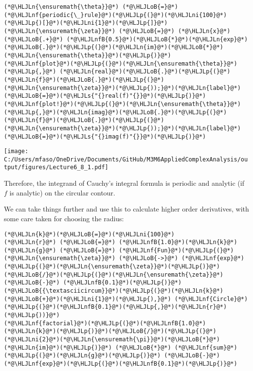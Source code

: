 \documentclass[12pt,a4paper]{article}
\newcommand{\HLJLn}[1]{#1}
\newcommand{\HLJLnf}[1]{\textcolor[RGB]{66,102,213}{#1}}
\newcommand{\HLJLs}[1]{\textcolor[RGB]{201,61,57}{#1}}
\newcommand{\HLJLnfB}[1]{\textcolor[RGB]{59,151,46}{#1}}
\newcommand{\HLJLni}[1]{\textcolor[RGB]{59,151,46}{#1}}
\newcommand{\HLJLoB}[1]{\textcolor[RGB]{102,102,102}{\textbf{#1}}}
\newcommand{\HLJLp}[1]{#1}
\begin{document}
\begin{lstlisting}
(*@\HLJLn{\ensuremath{\theta}}@*) (*@\HLJLoB{=}@*) (*@\HLJLnf{periodic{\_}rule}@*)(*@\HLJLp{(}@*)(*@\HLJLni{100}@*)(*@\HLJLp{)[}@*)(*@\HLJLni{1}@*)(*@\HLJLp{]}@*)
(*@\HLJLn{\ensuremath{\zeta}}@*) (*@\HLJLoB{=}@*) (*@\HLJLn{x}@*) (*@\HLJLoB{.+}@*) (*@\HLJLnfB{0.5}@*)(*@\HLJLoB{*}@*)(*@\HLJLn{exp}@*)(*@\HLJLoB{.}@*)(*@\HLJLp{(}@*)(*@\HLJLn{im}@*)(*@\HLJLoB{*}@*)(*@\HLJLn{\ensuremath{\theta}}@*)(*@\HLJLp{)}@*)
(*@\HLJLnf{plot}@*)(*@\HLJLp{(}@*)(*@\HLJLn{\ensuremath{\theta}}@*)(*@\HLJLp{,}@*) (*@\HLJLn{real}@*)(*@\HLJLoB{.}@*)(*@\HLJLp{(}@*)(*@\HLJLn{f}@*)(*@\HLJLoB{.}@*)(*@\HLJLp{(}@*)(*@\HLJLn{\ensuremath{\zeta}}@*)(*@\HLJLp{));}@*)(*@\HLJLn{label}@*)(*@\HLJLoB{=}@*)(*@\HLJLs{"{}real(f)"{}}@*)(*@\HLJLp{)}@*)
(*@\HLJLnf{plot!}@*)(*@\HLJLp{(}@*)(*@\HLJLn{\ensuremath{\theta}}@*)(*@\HLJLp{,}@*)(*@\HLJLn{imag}@*)(*@\HLJLoB{.}@*)(*@\HLJLp{(}@*)(*@\HLJLn{f}@*)(*@\HLJLoB{.}@*)(*@\HLJLp{(}@*)(*@\HLJLn{\ensuremath{\zeta}}@*)(*@\HLJLp{));}@*)(*@\HLJLn{label}@*)(*@\HLJLoB{=}@*)(*@\HLJLs{"{}imag(f)"{}}@*)(*@\HLJLp{)}@*)
\end{lstlisting}

\texttt{[image: C:/Users/mfaso/OneDrive/Documents/GitHub/M3M6AppliedComplexAnalysis/output/figures/Lecture6\_8\_1.pdf]}

Therefore, the integrand of Cauchy's integral formula is periodic and analytic (if $f$ is analytic) on the circular contour.

We can take things further and use this to calculate higher order derivatives, with some care taken for choosing the radius:


\begin{lstlisting}
(*@\HLJLn{k}@*)(*@\HLJLoB{=}@*)(*@\HLJLni{100}@*)
(*@\HLJLn{r}@*) (*@\HLJLoB{=}@*) (*@\HLJLnfB{1.0}@*)(*@\HLJLn{k}@*)
(*@\HLJLn{g}@*) (*@\HLJLoB{=}@*) (*@\HLJLnf{Fun}@*)(*@\HLJLp{(}@*) (*@\HLJLn{\ensuremath{\zeta}}@*) (*@\HLJLoB{->}@*) (*@\HLJLnf{exp}@*)(*@\HLJLp{(}@*)(*@\HLJLn{\ensuremath{\zeta}}@*)(*@\HLJLp{)}@*)(*@\HLJLoB{/}@*)(*@\HLJLp{(}@*)(*@\HLJLn{\ensuremath{\zeta}}@*) (*@\HLJLoB{-}@*) (*@\HLJLnfB{0.1}@*)(*@\HLJLp{)}@*)(*@\HLJLoB{{\textasciicircum}}@*)(*@\HLJLp{(}@*)(*@\HLJLn{k}@*)(*@\HLJLoB{+}@*)(*@\HLJLni{1}@*)(*@\HLJLp{),}@*) (*@\HLJLnf{Circle}@*)(*@\HLJLp{(}@*)(*@\HLJLnfB{0.1}@*)(*@\HLJLp{,}@*)(*@\HLJLn{r}@*)(*@\HLJLp{))}@*)
(*@\HLJLnf{factorial}@*)(*@\HLJLp{(}@*)(*@\HLJLnfB{1.0}@*)(*@\HLJLn{k}@*)(*@\HLJLp{)}@*)(*@\HLJLoB{/}@*)(*@\HLJLp{(}@*)(*@\HLJLni{2}@*)(*@\HLJLn{\ensuremath{\pi}}@*)(*@\HLJLoB{*}@*)(*@\HLJLn{im}@*)(*@\HLJLp{)}@*) (*@\HLJLoB{*}@*) (*@\HLJLnf{sum}@*)(*@\HLJLp{(}@*)(*@\HLJLn{g}@*)(*@\HLJLp{)}@*) (*@\HLJLoB{-}@*) (*@\HLJLnf{exp}@*)(*@\HLJLp{(}@*)(*@\HLJLnfB{0.1}@*)(*@\HLJLp{)}@*)
\end{lstlisting}
\end{document}
